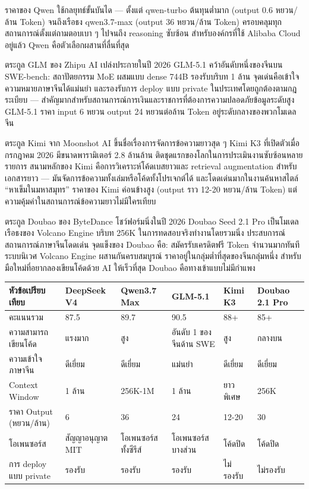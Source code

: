 ราคาของ Qwen ใช้กลยุทธ์ขั้นบันได — ตั้งแต่ qwen-turbo ต้นทุนต่ำมาก (output 0.6 หยวน/ล้าน Token) จนถึงเรือธง qwen3.7-max (output 36 หยวน/ล้าน Token) ครอบคลุมทุกสถานการณ์ตั้งแต่ถามตอบเบา ๆ ไปจนถึง reasoning ซับซ้อน สำหรับองค์กรที่ใช้ Alibaba Cloud อยู่แล้ว Qwen คือตัวเลือกผสานที่ลื่นที่สุด


ตระกูล GLM ของ Zhipu AI เปล่งประกายในปี 2026 GLM-5.1 คว้าอันดับหนึ่งของจีนบน SWE-bench: สถาปัตยกรรม MoE ผสมแบบ dense 744B รองรับบริบท 1 ล้าน จุดเด่นคือเข้าใจความหมายภาษาจีนได้แม่นยำ และรองรับการ deploy แบบ private ในประเทศโดยถูกต้องตามกฎระเบียบ — สำคัญมากสำหรับสถานการณ์การเงินและราชการที่ต้องการความปลอดภัยข้อมูลระดับสูง GLM-5.1 ราคา input 6 หยวน output 24 หยวนต่อล้าน Token อยู่ระดับกลางของพวกโมเดลจีน


ตระกูล Kimi จาก Moonshot AI ขึ้นชื่อเรื่องการจัดการข้อความยาวสุด ๆ Kimi K3 ที่เปิดตัวเมื่อกรกฎาคม 2026 มีขนาดพารามิเตอร์ 2.8 ล้านล้าน ติดชุดแรกของโลกในการประเมินงานซับซ้อนหลายรายการ สนามหลักของ Kimi คือการวิเคราะห์โค้ดเบสยาวและ retrieval augmentation สำหรับเอกสารยาว — มันจัดการข้อความทั้งเล่มหรือโค้ดทั้งโปรเจกต์ได้ และโดดเด่นมากในงานค้นหาสไตล์ “หาเข็มในมหาสมุทร” ราคาของ Kimi ค่อนข้างสูง (output ราว 12-20 หยวน/ล้าน Token) แต่ความคุ้มค่าในสถานการณ์ข้อความยาวไม่มีใครเทียบ


ตระกูล Doubao ของ ByteDance โชว์ฟอร์มนิ่งในปี 2026 Doubao Seed 2.1 Pro เป็นโมเดลเรือธงของ Volcano Engine บริบท 256K ในการทดสอบจริงทำงานโดยรวมนิ่ง ประสบการณ์สถานการณ์ภาษาจีนโดดเด่น จุดแข็งของ Doubao คือ: สมัครรับเครดิตฟรี Token จำนวนมากทันที ระบบนิเวศ Volcano Engine ผสานกันครบสมบูรณ์ ราคาอยู่ในกลุ่มต่ำที่สุดของจีนกลุ่มหนึ่ง สำหรับมือใหม่ที่อยากลองเขียนโค้ดด้วย AI ให้เร็วที่สุด Doubao คือทางเข้าแบบไม่มีกำแพง

\begin{center}
\begin{tabularx}{\linewidth}{|X|X|X|X|X|X|}
\hline
\textbf{หัวข้อเปรียบเทียบ} & \textbf{DeepSeek V4} & \textbf{Qwen3.7 Max} & \textbf{GLM-5.1} & \textbf{Kimi K3} & \textbf{Doubao 2.1 Pro} \tabularnewline
\hline
คะแนนรวม & 87.5 & 89.7 & 90.5 & 88+ & 85+ \tabularnewline
ความสามารถเขียนโค้ด & แรงมาก & สูง & อันดับ 1 ของจีนด้าน SWE & สูง & กลางบน \tabularnewline
ความเข้าใจภาษาจีน & ดีเยี่ยม & ดีเยี่ยม & แม่นยำ & ดีเยี่ยม & ดีเยี่ยม \tabularnewline
Context Window & 1 ล้าน & 256K-1M & 1 ล้าน & ยาวพิเศษ & 256K \tabularnewline
ราคา Output (หยวน/ล้าน) & 6 & 36 & 24 & 12-20 & 30 \tabularnewline
โอเพนซอร์ส & สัญญาอนุญาต MIT & โอเพนซอร์สทั้งซีรีส์ & โอเพนซอร์สบางส่วน & โค้ดปิด & โค้ดปิด \tabularnewline
การ deploy แบบ private & รองรับ & รองรับ & รองรับ & ไม่รองรับ & ไม่รองรับ \tabularnewline
\hline
\end{tabularx}
\end{center}

